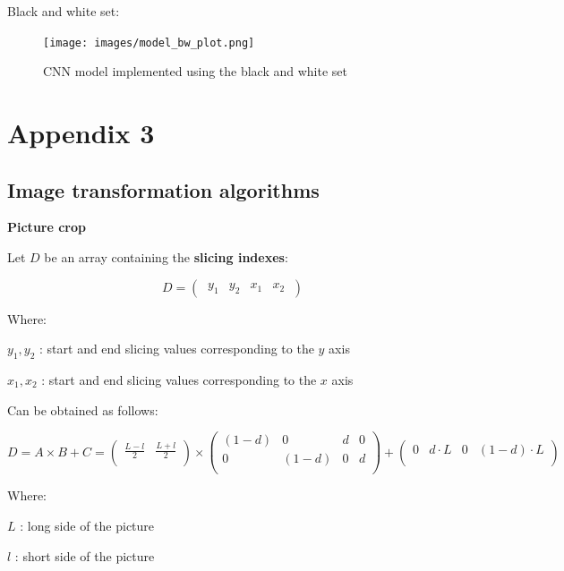 \documentclass[
  11pt,
]{article}
\begin{document}
\pagebreak

Black and white set:

\begin{figure}
\centering
\texttt{[image: images/model\_bw\_plot.png]}
\caption{CNN model implemented using the black and white set}
\end{figure}

\pagebreak

\hypertarget{appendix-3}{%
\section{Appendix 3}\label{appendix-3}}

\hypertarget{image-transformation-algorithms}{%
\subsection{Image transformation
algorithms}\label{image-transformation-algorithms}}

\textbf{Picture crop}

Let \(D\) be an array containing the \textbf{slicing indexes}:

\[ D = 
\begin{pmatrix}
\ y_{1} & y_{2} & x_{1} & x_{2}\
\end{pmatrix} 
\]

Where:

\(y_{1}, y_{2}\) : start and end slicing values corresponding to the
\(y\) axis

\(x_{1}, x_{2}\) : start and end slicing values corresponding to the
\(x\) axis

Can be obtained as follows:

\[ D = A \times B + C =
\begin{pmatrix}
\frac{L - l}{2} & \frac{L + l}{2}\\
\end{pmatrix} 
\times
\begin{pmatrix}
(1-d) & 0 & d & 0 \\
0 & (1-d) & 0 & d \\
\end{pmatrix} +
\begin{pmatrix}
0 & d \cdot L & 0 & (1-d) \cdot L \\
\end{pmatrix}
\]

Where:

\(L\) : long side of the picture

\(l\) : short side of the picture
\end{document}
